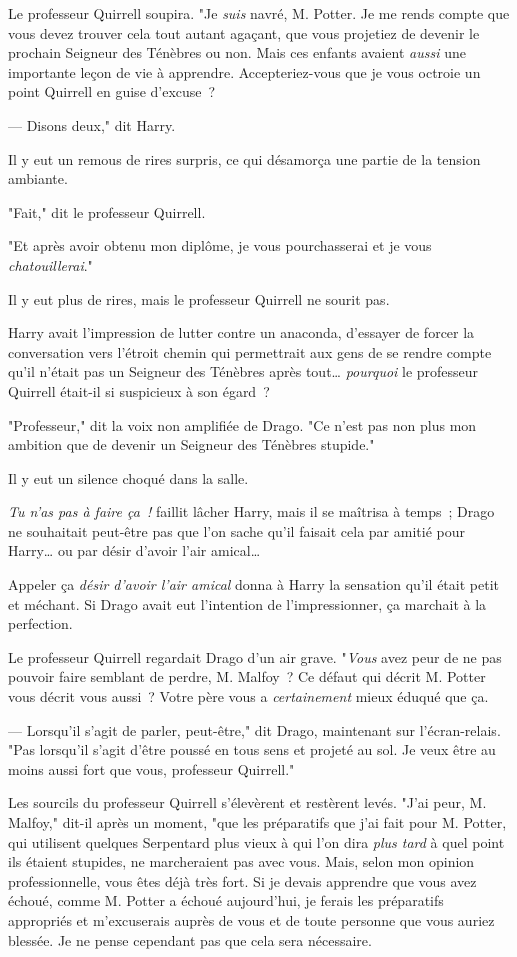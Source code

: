 Le professeur Quirrell soupira. "Je \emph{suis} navré, M. Potter. Je me rends compte que vous devez trouver cela tout autant agaçant, que vous projetiez de devenir le prochain Seigneur des Ténèbres ou non. Mais ces enfants avaient \emph{aussi} une importante leçon de vie à apprendre. Accepteriez-vous que je vous octroie un point Quirrell en guise d'excuse~?

--- Disons deux," dit Harry.

Il y eut un remous de rires surpris, ce qui désamorça une partie de la tension ambiante.

"Fait," dit le professeur Quirrell.

"Et après avoir obtenu mon diplôme, je vous pourchasserai et je vous \emph{chatouillerai}."

Il y eut plus de rires, mais le professeur Quirrell ne sourit pas.

Harry avait l'impression de lutter contre un anaconda, d'essayer de forcer la conversation vers l'étroit chemin qui permettrait aux gens de se rendre compte qu'il n'était pas un Seigneur des Ténèbres après tout… \emph{pourquoi} le professeur Quirrell était-il si suspicieux à son égard~?

"Professeur," dit la voix non amplifiée de Drago. "Ce n'est pas non plus mon ambition que de devenir un Seigneur des Ténèbres stupide."

Il y eut un silence choqué dans la salle.

\emph{Tu n'as pas à faire ça~!} faillit lâcher Harry, mais il se maîtrisa à temps~; Drago ne souhaitait peut-être pas que l'on sache qu'il faisait cela par amitié pour Harry… ou par désir d'avoir l'air amical…

Appeler ça \emph{désir d'avoir l'air amical} donna à Harry la sensation qu'il était petit et méchant. Si Drago avait eut l'intention de l'impressionner, ça marchait à la perfection.

Le professeur Quirrell regardait Drago d'un air grave. "\emph{Vous} avez peur de ne pas pouvoir faire semblant de perdre, M. Malfoy~? Ce défaut qui décrit M. Potter vous décrit vous aussi~? Votre père vous a \emph{certainement} mieux éduqué que ça.

--- Lorsqu'il s'agit de parler, peut-être," dit Drago, maintenant sur l'écran-relais. "Pas lorsqu'il s'agit d'être poussé en tous sens et projeté au sol. Je veux être au moins aussi fort que vous, professeur Quirrell."

Les sourcils du professeur Quirrell s'élevèrent et restèrent levés. "J'ai peur, M. Malfoy," dit-il après un moment, "que les préparatifs que j'ai fait pour M. Potter, qui utilisent quelques Serpentard plus vieux à qui l'on dira \emph{plus tard} à quel point ils étaient stupides, ne marcheraient pas avec vous. Mais, selon mon opinion professionnelle, vous êtes déjà très fort. Si je devais apprendre que vous avez échoué, comme M. Potter a échoué aujourd'hui, je ferais les préparatifs appropriés et m'excuserais auprès de vous et de toute personne que vous auriez blessée. Je ne pense cependant pas que cela sera nécessaire.


